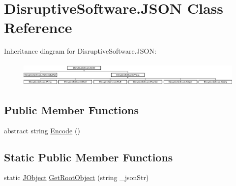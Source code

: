 \hypertarget{class_disruptive_software_1_1_j_s_o_n}{\section{Disruptive\+Software.\+J\+S\+O\+N Class Reference}
\label{class_disruptive_software_1_1_j_s_o_n}
}
Inheritance diagram for Disruptive\+Software.\+J\+S\+O\+N\+:\begin{figure}[H]
\begin{center}
\leavevmode
\includegraphics[height=1.238938cm]{class_disruptive_software_1_1_j_s_o_n}
\end{center}
\end{figure}
\subsection*{Public Member Functions}
\begin{DoxyCompactItemize}
\item 
abstract string \hyperlink{class_disruptive_software_1_1_j_s_o_n_a581c51c7c653360084afc72cd13a3c23}{Encode} ()
\end{DoxyCompactItemize}
\subsection*{Static Public Member Functions}
\begin{DoxyCompactItemize}
\item 
static \hyperlink{class_disruptive_software_1_1_j_object}{J\+Object} \hyperlink{class_disruptive_software_1_1_j_s_o_n_aa21b716c8243500ae6b95f62fd6dd156}{Get\+Root\+Object} (string \+\_\+json\+Str)
\end{DoxyCompactItemize}
